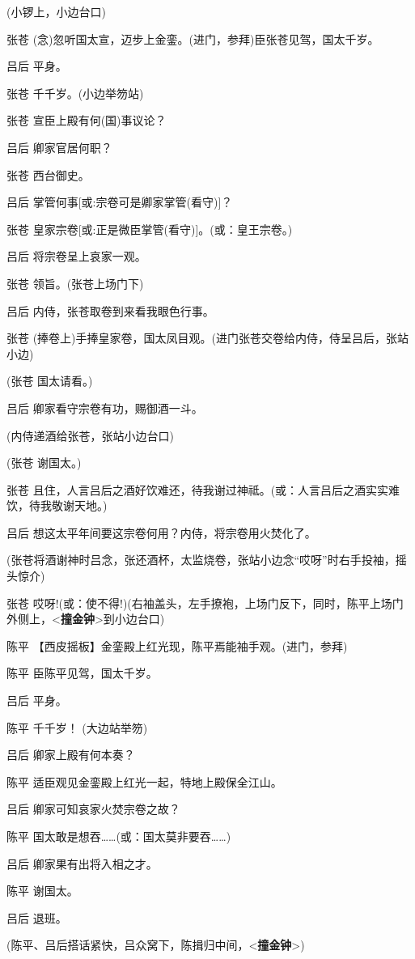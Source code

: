 (小锣上，小边台口)

张苍 (念)忽听国太宣，迈步上金銮。(进门，参拜)臣张苍见驾，国太千岁。

吕后 平身。

张苍 千千岁。(小边举笏站)

张苍 宣臣上殿有何(国)事议论？

吕后 卿家官居何职？

张苍 西台御史。

吕后 掌管何事{[}或:宗卷可是卿家掌管(看守){]}？

张苍 皇家宗卷{[}或:正是微臣掌管(看守){]}。(或：皇王宗卷。)

吕后 将宗卷呈上哀家一观。

张苍 领旨。(张苍上场门下)

吕后 内侍，张苍取卷到来看我眼色行事。

张苍
(捧卷上)手捧皇家卷，国太凤目观。(进门张苍交卷给内侍，侍呈吕后，张站小边)

(张苍 国太请看。)

吕后 卿家看守宗卷有功，赐御酒一斗。

(内侍递酒给张苍，张站小边台口)

(张苍 谢国太。)

张苍
且住，人言吕后之酒好饮难还，待我谢过神祗。(或：人言吕后之酒实实难饮，待我敬谢天地。)

吕后 想这太平年间要这宗卷何用？内侍，将宗卷用火焚化了。

(张苍将酒谢神时吕念，张还酒杯，太监烧卷，张站小边念``哎呀''时右手投袖，摇头惊介)

张苍
哎呀!(或：使不得!)(右袖盖头，左手撩袍，上场门反下，同时，陈平上场门外侧上，\textless{}\textbf{撞金钟}\textgreater{}到小边台口)

陈平 【西皮摇板】金銮殿上红光现，陈平焉能袖手观。(进门，参拜)

陈平 臣陈平见驾，国太千岁。

吕后 平身。

陈平 千千岁！ (大边站举笏)

吕后 卿家上殿有何本奏？

陈平 适臣观见金銮殿上红光一起，特地上殿保全江山。

吕后 卿家可知哀家火焚宗卷之故？

陈平 国太敢是想吞\ldots{}\ldots{}(或：国太莫非要吞\ldots{}\ldots{})

吕后 卿家果有出将入相之才。

陈平 谢国太。

吕后 退班。

(陈平、吕后搭话紧快，吕众窝下，陈揖归中间，\textless{}\textbf{撞金钟}\textgreater{})

